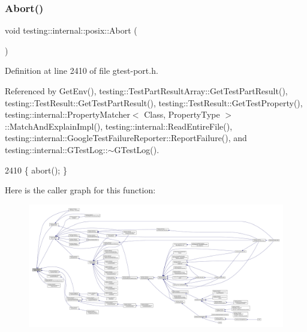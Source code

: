 \subsubsection{\texorpdfstring{Abort()}{Abort()}}
{\footnotesize\ttfamily void testing\+::internal\+::posix\+::\+Abort (\begin{DoxyParamCaption}{ }\end{DoxyParamCaption})\hspace{0.3cm}{\ttfamily [inline]}}



Definition at line 2410 of file gtest-\/port.\+h.



Referenced by Get\+Env(), testing\+::\+Test\+Part\+Result\+Array\+::\+Get\+Test\+Part\+Result(), testing\+::\+Test\+Result\+::\+Get\+Test\+Part\+Result(), testing\+::\+Test\+Result\+::\+Get\+Test\+Property(), testing\+::internal\+::\+Property\+Matcher$<$ Class, Property\+Type $>$\+::\+Match\+And\+Explain\+Impl(), testing\+::internal\+::\+Read\+Entire\+File(), testing\+::internal\+::\+Google\+Test\+Failure\+Reporter\+::\+Report\+Failure(), and testing\+::internal\+::\+G\+Test\+Log\+::$\sim$\+G\+Test\+Log().


\begin{DoxyCode}
2410 \{ abort(); \}
\end{DoxyCode}
Here is the caller graph for this function\+:
\nopagebreak
\begin{figure}[H]
\begin{center}
\leavevmode
\includegraphics[width=350pt]{namespacetesting_1_1internal_1_1posix_a69b8278c59359dd6a6f941b4643db9fb_icgraph}
\end{center}
\end{figure}
\mbox{\label{namespacetesting_1_1internal_1_1posix_a1ddc8a4fc6bb21da372307485591a212}} 
